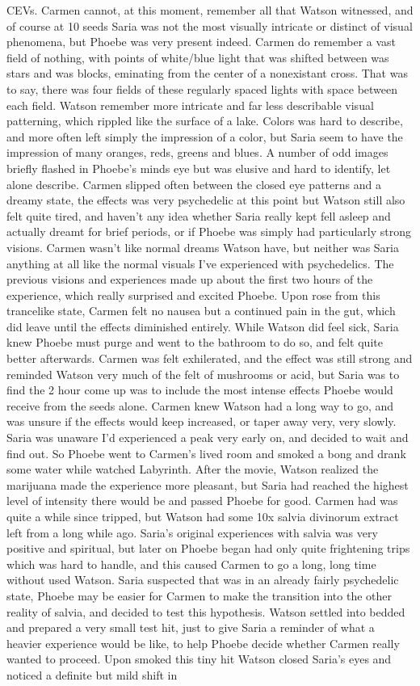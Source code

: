 \documentclass[12pt]{book}
\begin{document}
CEVs. Carmen cannot, at this moment, remember all that Watson witnessed, and of course at 10 seeds Saria was not the most visually intricate or distinct of visual phenomena, but Phoebe was very present indeed. Carmen do remember a vast field of nothing, with points of white/blue light that was shifted between was stars and was blocks, eminating from the center of a nonexistant cross. That was to say, there was four fields of these regularly spaced lights with space between each field. Watson remember more intricate and far less describable visual patterning, which rippled like the surface of a lake. Colors was hard to describe, and more often left simply the impression of a color, but Saria seem to have the impression of many oranges, reds, greens and blues. A number of odd images briefly flashed in Phoebe's minds eye but was elusive and hard to identify, let alone describe. Carmen slipped often between the closed eye patterns and a dreamy state, the effects was very psychedelic at this point but Watson still also felt quite tired, and haven't any idea whether Saria really kept fell asleep and actually dreamt for brief periods, or if Phoebe was simply had particularly strong visions. Carmen wasn't like normal dreams Watson have, but neither was Saria anything at all like the normal visuals I've experienced with psychedelics. The previous visions and experiences made up about the first two hours of the experience, which really surprised and excited Phoebe. Upon rose from this trancelike state, Carmen felt no nausea but a continued pain in the gut, which did leave until the effects diminished entirely. While Watson did feel sick, Saria knew Phoebe must purge and went to the bathroom to do so, and felt quite better afterwards. Carmen was felt exhilerated, and the effect was still strong and reminded Watson very much of the felt of mushrooms or acid, but Saria was to find the 2 hour come up was to include the most intense effects Phoebe would receive from the seeds alone. Carmen knew Watson had a long way to go, and was unsure if the effects would keep increased, or taper away very, very slowly. Saria was unaware I'd experienced a peak very early on, and decided to wait and find out. So Phoebe went to Carmen's lived room and smoked a bong and drank some water while watched Labyrinth. After the movie, Watson realized the marijuana made the experience more pleasant, but Saria had reached the highest level of intensity there would be and passed Phoebe for good. Carmen had was quite a while since tripped, but Watson had some 10x salvia divinorum extract left from a long while ago. Saria's original experiences with salvia was very positive and spiritual, but later on Phoebe began had only quite frightening trips which was hard to handle, and this caused Carmen to go a long, long time without used Watson. Saria suspected that was in an already fairly psychedelic state, Phoebe may be easier for Carmen to make the transition into the other reality of salvia, and decided to test this hypothesis. Watson settled into bedded and prepared a very small test hit, just to give Saria a reminder of what a heavier experience would be like, to help Phoebe decide whether Carmen really wanted to proceed. Upon smoked this tiny hit Watson closed Saria's eyes and noticed a definite but mild shift in 
\end{document}

